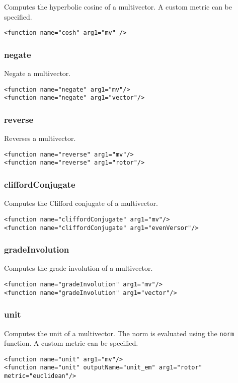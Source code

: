 \documentclass[10pt, a4paper]{article}
\begin{document}
Computes the hyperbolic cosine of a multivector.
A custom metric can be specified.
\begin{verbatim}
<function name="cosh" arg1="mv" />
\end{verbatim}

\subsubsection*{negate}

Negate a multivector.
\begin{verbatim}
<function name="negate" arg1="mv"/>
<function name="negate" arg1="vector"/>
\end{verbatim}

\subsubsection*{reverse}

Reverses a multivector.
\begin{verbatim}
<function name="reverse" arg1="mv"/>
<function name="reverse" arg1="rotor"/>
\end{verbatim}

\subsubsection*{cliffordConjugate}

Computes the Clifford conjugate of a multivector.
\begin{verbatim}
<function name="cliffordConjugate" arg1="mv"/>
<function name="cliffordConjugate" arg1="evenVersor"/>
\end{verbatim}

\subsubsection*{gradeInvolution}

Computes the grade involution of a multivector.
\begin{verbatim}
<function name="gradeInvolution" arg1="mv"/>
<function name="gradeInvolution" arg1="vector"/>
\end{verbatim}

\subsubsection*{unit}

Computes the unit of a multivector. The norm is evaluated using
the {\tt norm} function. A custom metric can be specified.
\begin{verbatim}
<function name="unit" arg1="mv"/>
<function name="unit" outputName="unit_em" arg1="rotor" metric="euclidean"/>
\end{verbatim}
\end{document}
